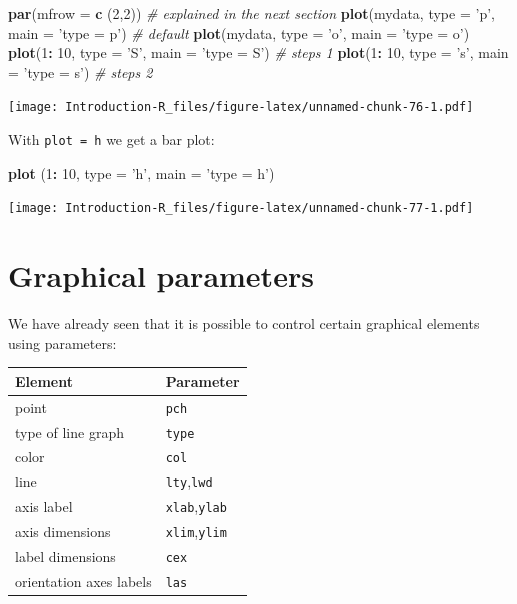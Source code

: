 \documentclass[]{book}
\newenvironment{Shaded}{\begin{snugshade}}{\end{snugshade}}
\newcommand{\CommentTok}[1]{\textcolor[rgb]{0.56,0.35,0.01}{\textit{#1}}}
\newcommand{\DataTypeTok}[1]{\textcolor[rgb]{0.13,0.29,0.53}{#1}}
\newcommand{\DecValTok}[1]{\textcolor[rgb]{0.00,0.00,0.81}{#1}}
\newcommand{\KeywordTok}[1]{\textcolor[rgb]{0.13,0.29,0.53}{\textbf{#1}}}
\newcommand{\NormalTok}[1]{#1}
\newcommand{\OperatorTok}[1]{\textcolor[rgb]{0.81,0.36,0.00}{\textbf{#1}}}
\newcommand{\StringTok}[1]{\textcolor[rgb]{0.31,0.60,0.02}{#1}}
\begin{document}
\begin{Shaded}
\begin{Highlighting}[]
\KeywordTok{par}\NormalTok{(}\DataTypeTok{mfrow =} \KeywordTok{c}\NormalTok{ (}\DecValTok{2}\NormalTok{,}\DecValTok{2}\NormalTok{)) }\CommentTok{# explained in the next section}
\KeywordTok{plot}\NormalTok{(mydata, }\DataTypeTok{type =} \StringTok{'p'}\NormalTok{, }\DataTypeTok{main =} \StringTok{'type = p'}\NormalTok{) }\CommentTok{# default}
\KeywordTok{plot}\NormalTok{(mydata, }\DataTypeTok{type =} \StringTok{'o'}\NormalTok{, }\DataTypeTok{main =} \StringTok{'type = o'}\NormalTok{)}
\KeywordTok{plot}\NormalTok{(}\DecValTok{1}\OperatorTok{:}\StringTok{ }\DecValTok{10}\NormalTok{, }\DataTypeTok{type =} \StringTok{'S'}\NormalTok{, }\DataTypeTok{main =} \StringTok{'type = S'}\NormalTok{) }\CommentTok{# steps 1}
\KeywordTok{plot}\NormalTok{(}\DecValTok{1}\OperatorTok{:}\StringTok{ }\DecValTok{10}\NormalTok{, }\DataTypeTok{type =} \StringTok{'s'}\NormalTok{, }\DataTypeTok{main =} \StringTok{'type = s'}\NormalTok{) }\CommentTok{# steps 2}
\end{Highlighting}
\end{Shaded}

\texttt{[image: Introduction-R\_files/figure-latex/unnamed-chunk-76-1.pdf]}

With \texttt{plot\ =\ \textquotesingle{}h\textquotesingle{}} we get a bar plot:

\begin{Shaded}
\begin{Highlighting}[]
\KeywordTok{plot}\NormalTok{ (}\DecValTok{1}\OperatorTok{:}\StringTok{ }\DecValTok{10}\NormalTok{, }\DataTypeTok{type =} \StringTok{'h'}\NormalTok{, }\DataTypeTok{main =} \StringTok{'type = h'}\NormalTok{)}
\end{Highlighting}
\end{Shaded}

\texttt{[image: Introduction-R\_files/figure-latex/unnamed-chunk-77-1.pdf]}

\hypertarget{graphical-parameters}{%
\section{Graphical parameters}\label{graphical-parameters}}

We have already seen that it is possible to control certain graphical elements using parameters:

\begin{longtable}[]{@{}ll@{}}
\toprule
Element & Parameter\tabularnewline
\midrule
\endhead
point & \texttt{pch}\tabularnewline
type of line graph & \texttt{type}\tabularnewline
color & \texttt{col}\tabularnewline
line & \texttt{lty},\texttt{lwd}\tabularnewline
axis label & \texttt{xlab},\texttt{ylab}\tabularnewline
axis dimensions & \texttt{xlim},\texttt{ylim}\tabularnewline
label dimensions & \texttt{cex}\tabularnewline
orientation axes labels & \texttt{las}\tabularnewline
\bottomrule
\end{longtable}
\end{document}
